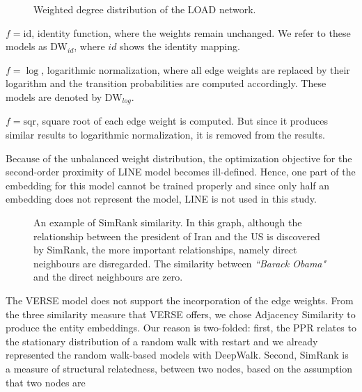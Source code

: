 \begin{figure}
\centering 
\resizebox{0.6\textwidth}{0.6\textwidth}{      

}
\caption{Weighted degree distribution of the LOAD network. }
\label{fig:degrees}
\end{figure}
\noindent
\begin{inparaenum}
\item  $f=\mathrm{id}$, identity function, where the weights remain unchanged. We refer to these models as DW$_{id}$, where $id$ shows the identity mapping. \\
\item  $f=\log$, logarithmic normalization, where all edge weights are replaced by their logarithm and the transition probabilities are computed accordingly. These models are denoted by  DW$_{log}$.\\
\item  $f=\mathrm{sqr}$, square root of each edge weight is computed. But since it produces similar results to logarithmic normalization, it is removed from the results.\\
\end{inparaenum}
\noindent
Because of the unbalanced weight distribution, the optimization objective for the second-order proximity of LINE model becomes ill-defined. Hence, one part of the embedding for this model cannot be trained properly and since only half an embedding does not represent the model, LINE is not used in this study. \\
\begin{figure}
\centering 
\resizebox{0.50\textwidth}{0.35\textwidth}{      

}
\caption{An example of SimRank similarity. In this graph, although the relationship between the president of Iran and the US is discovered by SimRank, the more important relationships, namely direct neighbours are disregarded. The similarity between \emph{``Barack Obama"} and the direct neighbours are zero.  }
\label{fig:simrank}
\end{figure}
\noindent
The VERSE model does not support the incorporation of the edge weights. From the three similarity measure that VERSE offers, we chose Adjacency Similarity to produce the entity embeddings. Our reason is two-folded: first, the PPR relates to the stationary distribution of a random walk with restart and we already represented the random walk-based models with DeepWalk. Second, SimRank is a measure of structural relatedness, between two nodes, based on the assumption that two nodes are
